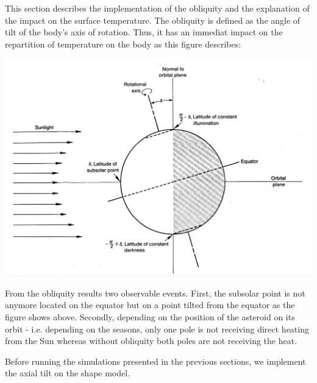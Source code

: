 This section describes the implementation of the obliquity and the explanation of the impact on the surface temperature. The obliquity is defined as the angle of tilt of the body's axis of rotation. Thus, it has an immediat impact on the repartition of temperature on the body as this figure describes: 
\begin{center}
    \includegraphics[width=\linewidth]{rsc/obliquity.png}
\end{center}
From the obliquity results two observable events. First, the subsolar point is not anymore located on the equator but on a point tilted from the equator as the figure shows above. Secondly, depending on the position of the asteroid on its orbit - i.e. depending on the seasons, only one pole is not receiving direct heating from the Sun whereas without obliquity both poles are not receiving the heat.

Before running the simulations presented in the previous sections, we implement the axial tilt on the shape model.

